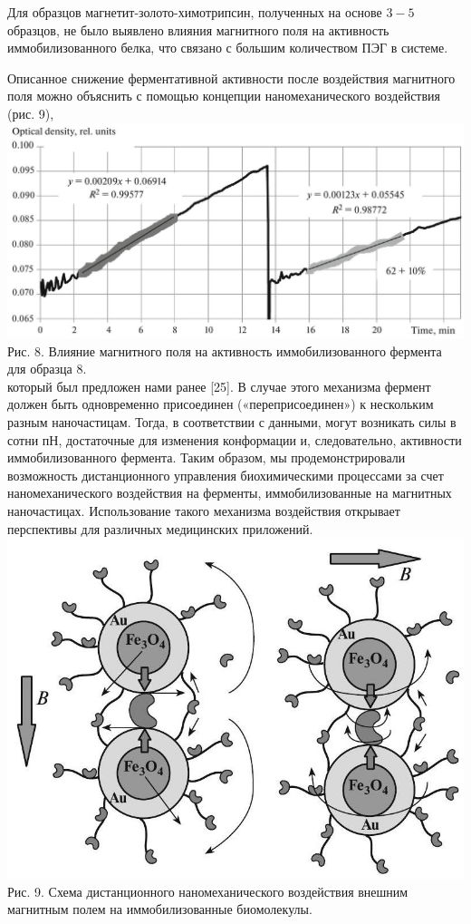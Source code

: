 \documentclass[10pt, a4paper]{article}
\begin{document}
Для образцов магнетит-золото-химотрипсин, полученных на основе \(3-5\) образцов, не было выявлено влияния магнитного поля на активность иммобилизованного белка, что связано с большим количеством ПЭГ в системе.

Описанное снижение ферментативной активности после воздействия магнитного поля можно объяснить с помощью концепции наномеханического воздействия (рис. 9),\\
\includegraphics[scale=0.35, center]{2024_10_23_dfdc0589534473f41785g-8(1)}
Рис. 8. Влияние магнитного поля на активность иммобилизованного фермента для образца 8.\\
который был предложен нами ранее [25]. В случае этого механизма фермент должен быть одновременно присоединен («переприсоединен») к нескольким разным наночастицам. Тогда, в соответствии с данными, могут возникать силы в сотни пН, достаточные для изменения конформации и, следовательно, активности иммобилизованного фермента.
Таким образом, мы продемонстрировали возможность дистанционного управления биохимическими процессами за счет наномеханического воздействия на ферменты, иммобилизованные на магнитных наночастицах. Использование такого механизма воздействия открывает перспективы для различных медицинских приложений.\\
\includegraphics[scale=0.5, center]{2024_10_23_dfdc0589534473f41785g-8}
Рис. 9. Схема дистанционного наномеханического воздействия внешним магнитным полем на иммобилизованные биомолекулы.
\end{document}
